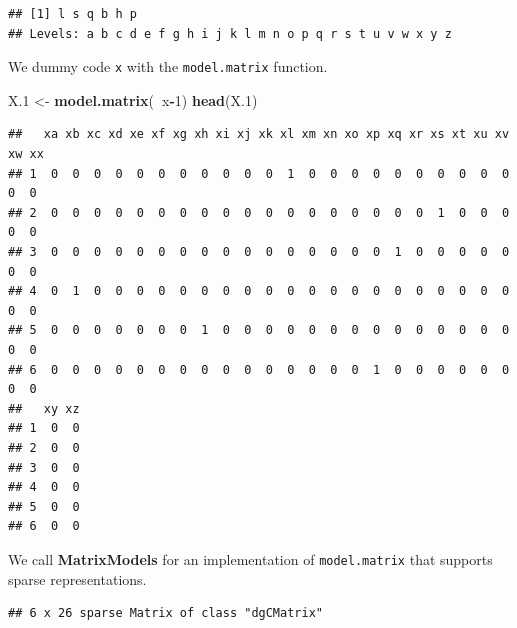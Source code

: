 \documentclass[]{book}
\newenvironment{Shaded}{\begin{snugshade}}{\end{snugshade}}
\newcommand{\KeywordTok}[1]{\textcolor[rgb]{0.13,0.29,0.53}{\textbf{#1}}}
\newcommand{\DecValTok}[1]{\textcolor[rgb]{0.00,0.00,0.81}{#1}}
\newcommand{\StringTok}[1]{\textcolor[rgb]{0.31,0.60,0.02}{#1}}
\newcommand{\CommentTok}[1]{\textcolor[rgb]{0.56,0.35,0.01}{\textit{#1}}}
\newcommand{\OperatorTok}[1]{\textcolor[rgb]{0.81,0.36,0.00}{\textbf{#1}}}
\newcommand{\NormalTok}[1]{#1}
\theoremstyle{definition}
\theoremstyle{definition}
\theoremstyle{definition}
\theoremstyle{remark}
\begin{document}
\begin{verbatim}
## [1] l s q b h p
## Levels: a b c d e f g h i j k l m n o p q r s t u v w x y z
\end{verbatim}

We dummy code \texttt{x} with the \texttt{model.matrix} function.

\begin{Shaded}
\begin{Highlighting}[]
\NormalTok{X.}\DecValTok{1}\NormalTok{ <-}\StringTok{ }\KeywordTok{model.matrix}\NormalTok{(}\OperatorTok{~}\NormalTok{x}\OperatorTok{-}\DecValTok{1}\NormalTok{)}
\KeywordTok{head}\NormalTok{(X.}\DecValTok{1}\NormalTok{)}
\end{Highlighting}
\end{Shaded}

\begin{verbatim}
##   xa xb xc xd xe xf xg xh xi xj xk xl xm xn xo xp xq xr xs xt xu xv xw xx
## 1  0  0  0  0  0  0  0  0  0  0  0  1  0  0  0  0  0  0  0  0  0  0  0  0
## 2  0  0  0  0  0  0  0  0  0  0  0  0  0  0  0  0  0  0  1  0  0  0  0  0
## 3  0  0  0  0  0  0  0  0  0  0  0  0  0  0  0  0  1  0  0  0  0  0  0  0
## 4  0  1  0  0  0  0  0  0  0  0  0  0  0  0  0  0  0  0  0  0  0  0  0  0
## 5  0  0  0  0  0  0  0  1  0  0  0  0  0  0  0  0  0  0  0  0  0  0  0  0
## 6  0  0  0  0  0  0  0  0  0  0  0  0  0  0  0  1  0  0  0  0  0  0  0  0
##   xy xz
## 1  0  0
## 2  0  0
## 3  0  0
## 4  0  0
## 5  0  0
## 6  0  0
\end{verbatim}

We call \textbf{MatrixModels} for an implementation of
\texttt{model.matrix} that supports sparse representations.

\begin{Shaded}
\end{Shaded}

\begin{verbatim}
## 6 x 26 sparse Matrix of class "dgCMatrix"
\end{verbatim}
\end{document}
